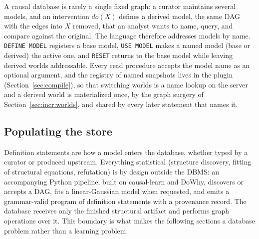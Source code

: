 A causal database is rarely a single fixed graph: a curator maintains several
models, and an intervention $do(X)$ defines a derived model, the same DAG with
the edges into $X$ removed, that an analyst wants to name, query, and compare
against the original. The language therefore addresses models by name.
\lstinline[style=causaldsl]|DEFINE MODEL| registers a base model,
\lstinline[style=causaldsl]|USE MODEL| makes a named model (base or derived)
the active one, and \lstinline[style=causaldsl]|RESET| returns to the base
model while leaving derived worlds addressable. Every read procedure accepts
the model name as an optional argument, and the registry of named snapshots
lives in the plugin (Section~\ref{sec:compile}), so that switching worlds is
a name lookup on the server and a derived world is materialized once, by the
graph surgery of Section~\ref{sec:incr:worlds}, and shared by every later
statement that names it.

\subsection{Populating the store}\label{sec:lang:populate}

Definition statements are how a model enters the database, whether typed by
a curator or produced upstream. Everything statistical (structure discovery,
fitting of structural equations, refutation) is by design outside the DBMS:
an accompanying Python pipeline, built on causal-learn and DoWhy, discovers or
accepts a DAG, fits a linear-Gaussian model when requested, and emits a
grammar-valid program of definition statements with a provenance record. The
database receives only the finished structural artifact and performs graph
operations over it. This boundary is what makes the following sections a
database problem rather than a learning problem.
